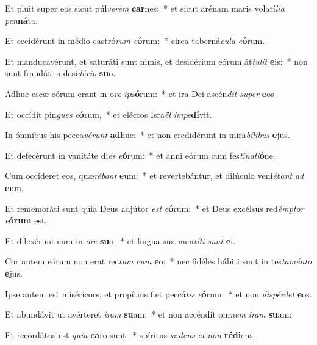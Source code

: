 \item Et pluit super eos sicut púl\textit{ve}\textit{rem} \textbf{car}nes:~* et sicut arénam maris volatí\textit{li}\textit{a} \textit{pen}\textbf{ná}ta.
\item Et cecidérunt in médio castró\textit{rum} \textit{e}\textbf{ó}rum:~* circa taberná\textit{cu}\textit{la} \textit{e}\textbf{ó}rum.
\item Et manducavérunt, et saturáti sunt nimis, et desidérium eórum át\textit{tu}\textit{lit} \textbf{e}is:~* non sunt fraudáti a desi\textit{dé}\textit{ri}\textit{o} \textbf{su}o.
\item Adhuc escæ eórum erant in o\textit{re} \textit{ip}\textbf{só}rum:~* et ira Dei ascén\textit{dit} \textit{su}\textit{per} \textbf{e}os
\item Et occídit pin\textit{gues} \textit{e}\textbf{ó}rum,~* et eléctos Isra\textit{ël} \textit{im}\textit{pe}\textbf{dí}vit.
\item In ómnibus his pecca\textit{vé}\textit{runt} \textbf{ad}huc:~* et non credidérunt in mira\textit{bí}\textit{li}\textit{bus} \textbf{e}jus.
\item Et defecérunt in vanitáte di\textit{es} \textit{e}\textbf{ó}rum:~* et anni eórum cum fes\textit{ti}\textit{na}\textit{ti}\textbf{ó}ne.
\item Cum occíderet eos, quæ\textit{ré}\textit{bant} \textbf{e}um:~* et revertebántur, et dilúculo veni\textit{é}\textit{bant} \textit{ad} \textbf{e}um.
\item Et rememoráti sunt quia Deus adjútor \textit{est} \textit{e}\textbf{ó}rum:~* et Deus excélsus red\textit{émp}\textit{tor} \textit{e}\textbf{ó}\textbf{rum} est.
\item Et dilexérunt eum in \textit{o}\textit{re} \textbf{su}o,~* et lingua sua men\textit{tí}\textit{ti} \textit{sunt} \textbf{e}i.
\item Cor autem eórum non erat rec\textit{tum} \textit{cum} \textbf{e}o:~* nec fidéles hábiti sunt in tes\textit{ta}\textit{mén}\textit{to} \textbf{e}jus.
\item Ipse autem est miséricors, et propítius fiet peccá\textit{tis} \textit{e}\textbf{ó}rum:~* et non \textit{dis}\textit{pér}\textit{det} \textbf{e}os.
\item Et abundávit ut avérteret \textit{i}\textit{ram} \textbf{su}am:~* et non accéndit om\textit{nem} \textit{i}\textit{ram} \textbf{su}am:
\item Et recordátus est \textit{qui}\textit{a} \textbf{ca}ro sunt:~* spíritus va\textit{dens} \textit{et} \textit{non} \textbf{réd}\textbf{i}ens.
